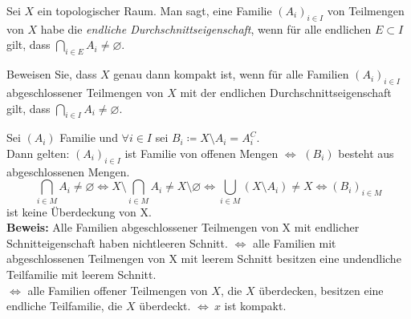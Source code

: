 \begin{assignment}
  Sei \( X \) ein topologischer Raum. Man sagt, eine Familie \( {(A_i)}_{i \in I} \) von Teilmengen von \( X \) habe die \emph{endliche Durchschnittseigenschaft}, wenn für alle endlichen \( E \subset I \) gilt, dass \( \bigcap_{i \in E} A_i \neq \varnothing \).

  Beweisen Sie, dass \( X \) genau dann kompakt ist, wenn für alle Familien \( {(A_i)}_{i \in I} \)abgeschlossener Teilmengen von \( X \) mit der endlichen Durchschnittseigenschaft gilt, dass \( \bigcap_{i \in I} A_i \neq \varnothing \).
\end{assignment}
\begin{solution}
  Sei \( (A_i) \) Familie und \( \forall i \in I \) sei \( B_i \coloneqq X \setminus A_i = A_i^{C} \). \\
  Dann gelten: 
  \( {(A_i)}_ { i \in I} \) ist Familie von offenen Mengen \( \Longleftrightarrow \) \( (B_i) \) besteht aus abgeschlossenen Mengen.
  \begin{equation*}
    \bigcap_{i \in M} A_i \neq \varnothing \Leftrightarrow X \setminus \bigcap_{i \in M} A_i \neq X \setminus \varnothing \Leftrightarrow \bigcup_ {i \in M} (X \setminus A_i) \neq X \Longleftrightarrow {(B_i)}_{i \in M} 
  \end{equation*}
  ist keine Überdeckung von X. \\
  \textbf{Beweis:} Alle Familien abgeschlossener Teilmengen von X mit endlicher Schnitteigenschaft haben nichtleeren Schnitt. \( \Leftrightarrow \) alle Familien mit abgeschlossenen Teilmengen von X mit leerem Schnitt besitzen eine undendliche Teilfamilie mit leerem Schnitt. \\
  \( \Leftrightarrow \) alle Familien offener Teilmengen von \( X \), die \( X \) überdecken, besitzen eine endliche Teilfamilie, die \( X \) überdeckt. \( \Longleftrightarrow \ x \) ist kompakt.
\end{solution}

